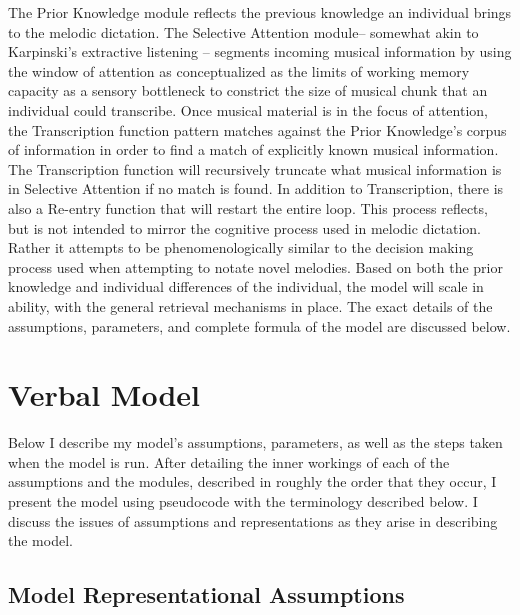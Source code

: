 \documentclass[12pt,]{book}
\begin{document}
The Prior Knowledge module reflects the previous knowledge an individual brings to the melodic dictation.
The Selective Attention module-- somewhat akin to Karpinski's extractive listening \citep{karpinskiAuralSkillsAcquisition2000, karpinskiModelMusicPerception1990}-- segments incoming musical information by using the window of attention as conceptualized as the limits of working memory capacity as a sensory bottleneck to constrict the size of musical chunk that an individual could transcribe.
Once musical material is in the focus of attention, the Transcription function pattern matches against the Prior Knowledge's corpus of information in order to find a match of explicitly known musical information.
The Transcription function will recursively truncate what musical information is in Selective Attention if no match is found.
In addition to Transcription, there is also a Re-entry function that will restart the entire loop.
This process reflects, but is not intended to mirror the cognitive process used in melodic dictation.
Rather it attempts to be phenomenologically similar to the decision making process used when attempting to notate novel melodies.
Based on both the prior knowledge and individual differences of the individual, the model will scale in ability, with the general retrieval mechanisms in place.
The exact details of the assumptions, parameters, and complete formula of the model are discussed below.

\hypertarget{verbal-model}{%
\section{Verbal Model}\label{verbal-model}}

Below I describe my model's assumptions, parameters, as well as the steps taken when the model is run.
After detailing the inner workings of each of the assumptions and the modules, described in roughly the order that they occur, I present the model using pseudocode with the terminology described below.
I discuss the issues of assumptions and representations as they arise in describing the model.

\hypertarget{model-representational-assumptions}{%
\subsection{Model Representational Assumptions}\label{model-representational-assumptions}}
\end{document}
